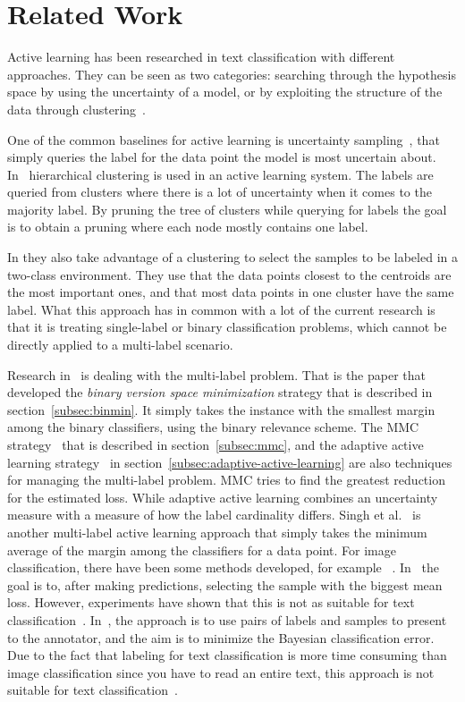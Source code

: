 \section{Related Work}

Active learning has been researched in text classification with different approaches.
They can be seen as two categories: searching through the hypothesis space by using the uncertainty of a model, or by exploiting the structure of the data through clustering~\cite{dasgupta2008hierarchical}.

One of the common baselines for active learning is uncertainty sampling~\cite{lewis1994sequential}, that simply queries the label for the data point the model is most uncertain about.
In~\cite{dasgupta2008hierarchical} hierarchical clustering is used in an active learning system.
The labels are queried from clusters where there is a lot of uncertainty when it comes to the majority label.
By pruning the tree of clusters while querying for labels the goal is to obtain a pruning where each node mostly contains one label.

In \cite{nguyen2004active} they also take advantage of a clustering to select the samples to be labeled in a two-class environment.
They use that the data points closest to the centroids are the most important ones, and that most data points in one cluster have the same label.
What this approach has in common with a lot of the current research is that it is treating single-label or binary classification problems, which cannot be directly applied to a multi-label scenario.

Research in~\cite{brinker2006active} is dealing with the multi-label problem.
That is the paper that developed the \textit{binary version space minimization} strategy that is described in section~\ref{subsec:binmin}.
It simply takes the instance with the smallest margin among the binary classifiers, using the binary relevance scheme.
The MMC strategy~\cite{yang2009effective} that is described in section~\ref{subsec:mmc}, and the adaptive active learning strategy~\cite{li2013active} in section~\ref{subsec:adaptive-active-learning} are also techniques for managing the multi-label problem.
MMC tries to find the greatest reduction for the estimated loss.
While adaptive active learning combines an uncertainty measure with a measure of how the label cardinality differs.
Singh et al\@.~\cite{singh2009active} is another multi-label active learning approach that simply takes the minimum average of the margin among the classifiers for a data point.
For image classification, there have been some methods developed, for example ~\cite{li2004multilabel, qi2008two}.
In~\cite{li2004multilabel} the goal is to, after making predictions, selecting the sample with the biggest mean loss.
However, experiments have shown that this is not as suitable for text classification~\cite{yang2009effective}.
In~\cite{qi2008two}, the approach is to use pairs of labels and samples to present to the annotator, and the aim is to minimize the Bayesian classification error.
Due to the fact that labeling for text classification is more time consuming than image classification since you have to read an entire text, this approach is not suitable for text classification~\cite{yang2009effective}.

